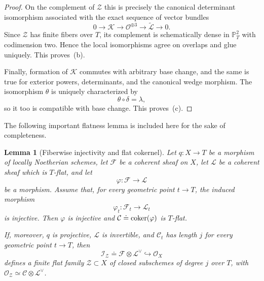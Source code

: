 \documentclass[11pt]{amsart} %
\newcommand{\lar}{\longrightarrow}
\newtheorem{Lemma}[Theorem]{Lemma}
\theoremstyle{definition}
\def\coker{\mbox{\rm coker}}
\def\NZQ{\mathbb}               %
\def\PP{{\NZQ P}}
\begin{document}
\begin{proof}
On the complement of $\mathcal Z$ this is precisely the canonical
determinant isomorphism associated with the exact sequence of vector
bundles
\[
0\lar\mathcal K
\lar\mathcal O^{\oplus3}
\lar\widetilde{\mathcal L}
\lar0.
\]
Since $\mathcal Z$ has finite fibers over $T$, its complement is
schematically dense in $\PP^2_T$ with codimension two. Hence the local isomorphisms agree
on overlaps and glue uniquely. This proves~(b).

Finally, formation of $\mathcal K$ commutes with arbitrary base
change, and the same is true for exterior powers, determinants, and
the canonical wedge morphism. The isomorphism $\theta$ is uniquely
characterized by
\[
\theta\circ\delta=\lambda,
\]
so it too is compatible with base change. This proves~(c).
\end{proof}

The following important flatness lemma is included here for the sake of completeness.

\begin{Lemma}[Fiberwise injectivity and flat cokernel]
\label{lem:flatness-finite-cokernel}
Let $q:X\lar T$ be a morphism of locally Noetherian schemes, let
$\mathcal F$ be a coherent sheaf on $X$, let $\mathcal L$ be a
coherent sheaf which is $T$-flat, and let
\[
\varphi:\mathcal F\longrightarrow\mathcal L
\]
be a morphism. Assume that, for every geometric point $t\lar T$, the
induced morphism
\[
\varphi_t:\mathcal F_t\longrightarrow\mathcal L_t
\]
is injective. Then $\varphi$ is injective and \(\mathcal C\doteq\coker(\varphi)\)
is $T$-flat.

If, moreover, $q$ is projective, $\mathcal L$ is invertible, and
$\mathcal C_t$ has length $j$ for every geometric point $t\lar T$,
then
\[
\mathcal I_{\mathcal Z}
\doteq
\mathcal F\otimes\mathcal L^\vee
\hookrightarrow\mathcal O_X
\]
defines a finite flat family
\(\mathcal Z\subset X\) of closed subschemes of degree $j$ over $T$, with
\(\mathcal O_{\mathcal Z}
\simeq
\mathcal C\otimes\mathcal L^\vee
\).
\end{Lemma}
\end{document}
